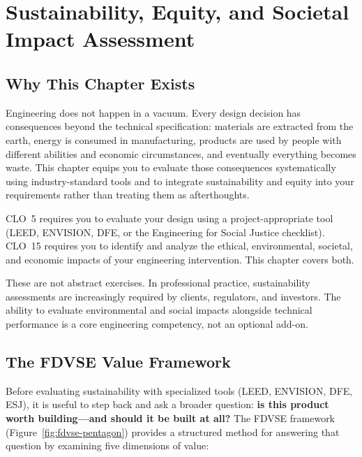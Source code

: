 \chapter{Sustainability, Equity, and Societal Impact Assessment}

\section{Why This Chapter Exists}
Engineering does not happen in a vacuum. Every design decision has consequences beyond the technical specification: materials are extracted from the earth, energy is consumed in manufacturing, products are used by people with different abilities and economic circumstances, and eventually everything becomes waste. This chapter equips you to evaluate those consequences systematically using industry-standard tools and to integrate sustainability and equity into your requirements rather than treating them as afterthoughts.

CLO~5 requires you to evaluate your design using a project-appropriate tool (LEED, ENVISION, DFE, or the Engineering for Social Justice checklist). CLO~15 requires you to identify and analyze the ethical, environmental, societal, and economic impacts of your engineering intervention. This chapter covers both.

These are not abstract exercises. In professional practice, sustainability assessments are increasingly required by clients, regulators, and investors. The ability to evaluate environmental and social impacts alongside technical performance is a core engineering competency, not an optional add-on.

\section{The FDVSE Value Framework}\label{sec:fdvse}
Before evaluating sustainability with specialized tools (LEED, ENVISION, DFE, ESJ), it is useful to step back and ask a broader question: \textbf{is this product worth building---and should it be built at all?} The FDVSE framework (Figure~\ref{fig:fdvse-pentagon}) provides a structured method for answering that question by examining five dimensions of value:

